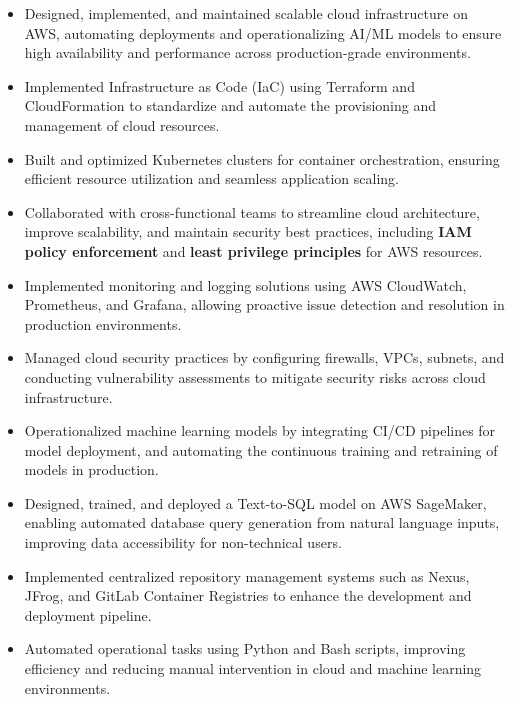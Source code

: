 \documentclass[a4paper]{article}
\begin{document}
\begin{itemize} \itemsep 1pt

    \item Designed, implemented, and maintained scalable cloud infrastructure on AWS, automating deployments and operationalizing AI/ML models to ensure high availability and performance across production-grade environments.
    \item Implemented Infrastructure as Code (IaC) using Terraform and CloudFormation to standardize and automate the provisioning and management of cloud resources.
    \item Built and optimized Kubernetes clusters for container orchestration, ensuring efficient resource utilization and seamless application scaling.
    \item Collaborated with cross-functional teams to streamline cloud architecture, improve scalability, and maintain security best practices, including \textbf{IAM policy enforcement} and \textbf{least privilege principles} for AWS resources.
    \item Implemented monitoring and logging solutions using AWS CloudWatch, Prometheus, and Grafana, allowing proactive issue detection and resolution in production environments.
    \item Managed cloud security practices by configuring firewalls, VPCs, subnets, and conducting vulnerability assessments to mitigate security risks across cloud infrastructure.
    \item Operationalized machine learning models by integrating CI/CD pipelines for model deployment, and automating the continuous training and retraining of models in production.
    \item Designed, trained, and deployed a Text-to-SQL model on AWS SageMaker, enabling automated database query generation from natural language inputs, improving data accessibility for non-technical users.
    \item Implemented centralized repository management systems such as Nexus, JFrog, and GitLab Container Registries to enhance the development and deployment pipeline.
    \item Automated operational tasks using Python and Bash scripts, improving efficiency and reducing manual intervention in cloud and machine learning environments.    
\end{itemize}
\end{document}
